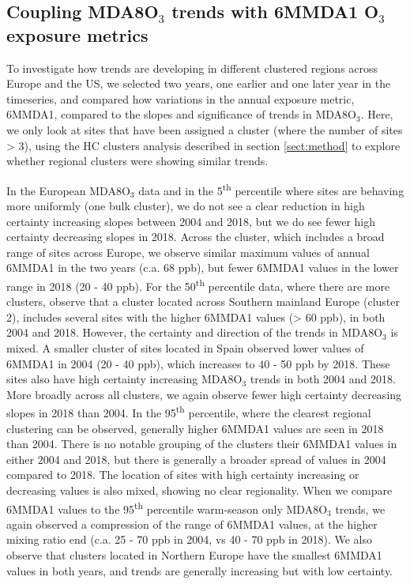 \documentclass[journal abbreviation, manuscript]{copernicus}
\begin{document}


\subsection{Coupling MDA8O$_3$ trends with 6MMDA1 O$_3$ exposure metrics} \label{sect:polluted_stuff}

To investigate how trends are developing in different clustered regions across Europe and the US, we selected two years, one earlier and one later year in the timeseries, and compared how variations in the annual exposure metric, 6MMDA1, compared to the slopes and significance of trends in MDA8O$_3$. Here, we only look at sites that have been assigned a cluster (where the number of sites > 3), using the HC clusters analysis described in section \ref{sect:method} to explore whether regional clusters were showing similar trends. 

In the European MDA8O$_3$ data and in the 5\textsuperscript{th} percentile where sites are behaving more uniformly (one bulk cluster), we do not see a clear reduction in high certainty increasing slopes between 2004 and 2018, but we do see fewer high certainty decreasing slopes in 2018. Across the cluster, which includes a broad range of sites across Europe, we observe similar maximum values of annual 6MMDA1 in the two years (c.a. 68 ppb), but fewer 6MMDA1 values in the lower range in 2018 (20 - 40 ppb). For the 50\textsuperscript{th} percentile data, where there are more clusters, observe that a cluster located across Southern mainland Europe (cluster 2), includes several sites with the higher 6MMDA1 values (> 60 ppb), in both 2004 and 2018. However, the certainty and direction of the trends in MDA8O$_3$ is mixed. A smaller cluster of sites located in Spain observed lower values of 6MMDA1 in 2004 (20 - 40 ppb), which increases to 40 - 50 ppb by 2018. These sites also have high certainty increasing MDA8O$_3$ trends in both 2004 and 2018. More broadly across all clusters, we again observe fewer high certainty decreasing slopes in 2018 than 2004. In the 95\textsuperscript{th} percentile, where the clearest regional clustering can be observed, generally higher 6MMDA1 values are seen in 2018 than 2004. There is no notable grouping of the clusters their 6MMDA1 values in either 2004 and 2018, but there is generally a broader spread of values in 2004 compared to 2018. The location of sites with high certainty increasing or decreasing values is also mixed, showing no clear regionality. When we compare 6MMDA1 values to the 95\textsuperscript{th} percentile warm-season only MDA8O$_3$ trends, we again observed a compression of the range of 6MMDA1 values, at the higher mixing ratio end (c.a. 25 - 70 ppb in 2004, vs 40 - 70 ppb in 2018). We also observe that clusters located in Northern Europe have the smallest 6MMDA1 values in both years, and trends are generally increasing but with low certainty.
\end{document}
